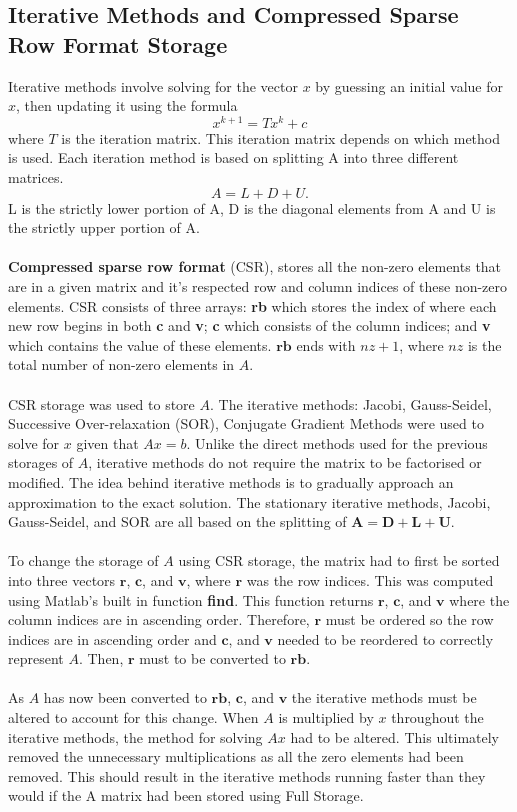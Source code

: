 \documentclass[12pt,a4paper]{article}
\begin{document}
\subsection{Iterative Methods and Compressed Sparse Row Format Storage}
Iterative methods involve solving for the vector $x$ by guessing an initial value for $x$, then updating it using the formula
\[x^{k+1}=Tx^k+c\]
where $T$ is the iteration matrix. This iteration matrix depends on which method is used. Each iteration method is based on splitting A into three different matrices.
\[A=L+D+U.\]
L is the strictly lower portion of A, D is the diagonal elements from A and U is the strictly upper portion of A.
\\\\
\textbf{Compressed sparse row format} (CSR), stores all the non-zero elements that are in a given matrix and it's respected row and column indices of these non-zero elements. CSR consists of three arrays: \textbf{rb} which stores the index of where each new row begins in both \textbf{c} and \textbf{v}; \textbf{c} which consists of the column indices; and \textbf{v} which contains the value of these elements. $\textbf{rb}$ ends with $nz + 1$, where $nz$ is the total number of non-zero elements in $A$.
\\\\
CSR storage was used to store $A$. The iterative methods: Jacobi, Gauss-Seidel, Successive Over-relaxation (SOR), Conjugate Gradient Methods were used to solve for $x$ given that $Ax = b$. Unlike the direct methods used for the previous storages of $A$, iterative methods do not require the matrix to be factorised or modified. The idea behind iterative methods is to gradually approach an approximation to the exact solution. The stationary iterative methods, Jacobi, Gauss-Seidel, and SOR are all based on the splitting of $\textbf{A} = \textbf{D} + \textbf{L} + \textbf{U}$.
\\\\
To change the storage of $A$ using CSR storage, the matrix had to first be sorted into three vectors $\textbf{r}$, $\textbf{c}$, and $\textbf{v}$, where $\textbf{r}$ was the row indices. This was computed using Matlab's built in function \textbf{find}. This function returns $\textbf{r}$, $\textbf{c}$, and $\textbf{v}$ where the column indices are in ascending order. Therefore, $\textbf{r}$ must be ordered so the row indices are in ascending order and $\textbf{c}$, and $\textbf{v}$ needed to be reordered to correctly represent $A$. Then, $\textbf{r}$ must to be converted to $\textbf{rb}$. 
\\\\
As $A$ has now been converted to $\textbf{rb}$, $\textbf{c}$, and $\textbf{v}$ the iterative methods must be altered to account for this change. When $A$ is multiplied by $x$ throughout the iterative methods, the method for solving $Ax$ had to be altered. This ultimately removed the unnecessary multiplications as all the zero elements had been removed. This should result in the iterative methods running faster than they would if the A matrix had been stored using Full Storage.
\end{document}
